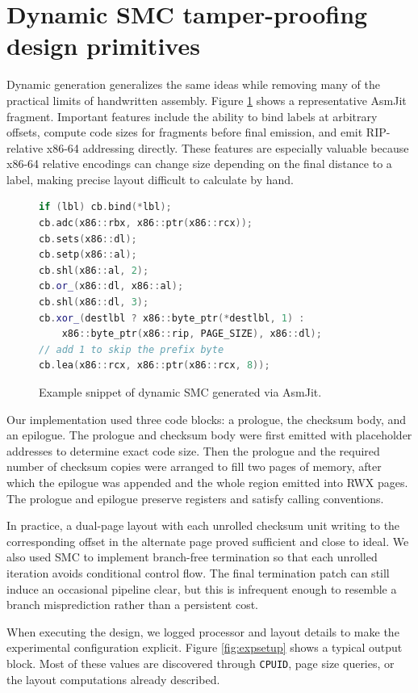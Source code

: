 \documentclass[11pt]{article}
\begin{document}
\section{Dynamic SMC tamper-proofing design primitives}\label{sec:dynamic-primitives}

Dynamic generation generalizes the same ideas while removing many of the practical
limits of handwritten assembly.  Figure \ref{fig:dynsmc} shows a representative
AsmJit fragment.  Important features include the ability to bind labels at
arbitrary offsets, compute code sizes for fragments before final emission, and
emit RIP-relative x86-64 addressing directly.  These features are especially
valuable because x86-64 relative encodings can change size depending on the final
distance to a label, making precise layout difficult to calculate by hand.

\begin{figure}[t]
\centering
\begin{lstlisting}[language=C++]
if (lbl) cb.bind(*lbl);
cb.adc(x86::rbx, x86::ptr(x86::rcx));
cb.sets(x86::dl);
cb.setp(x86::al);
cb.shl(x86::al, 2);
cb.or_(x86::dl, x86::al);
cb.shl(x86::dl, 3);
cb.xor_(destlbl ? x86::byte_ptr(*destlbl, 1) :
    x86::byte_ptr(x86::rip, PAGE_SIZE), x86::dl);
// add 1 to skip the prefix byte
cb.lea(x86::rcx, x86::ptr(x86::rcx, 8));
\end{lstlisting}
\caption{Example snippet of dynamic SMC generated via AsmJit.}
\label{fig:dynsmc}
\end{figure}

Our implementation used three code blocks: a prologue, the checksum body, and an
epilogue.  The prologue and checksum body were first emitted with placeholder
addresses to determine exact code size.  Then the prologue and the required
number of checksum copies were arranged to fill two pages of memory, after which
the epilogue was appended and the whole region emitted into RWX pages.  The
prologue and epilogue preserve registers and satisfy calling conventions.

In practice, a dual-page layout with each unrolled checksum unit writing to the
corresponding offset in the alternate page proved sufficient and close to ideal.
We also used SMC to implement branch-free termination so that each unrolled
iteration avoids conditional control flow.  The final termination patch can still
induce an occasional pipeline clear, but this is infrequent enough to resemble a
branch misprediction rather than a persistent cost.

When executing the design, we logged processor and layout details to make the
experimental configuration explicit.  Figure \ref{fig:expsetup} shows a typical
output block.  Most of these values are discovered through \texttt{CPUID}, page
size queries, or the layout computations already described.
\end{document}
